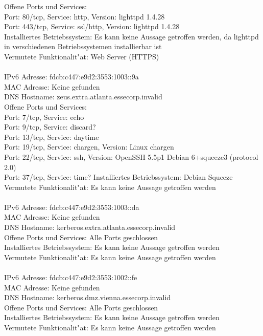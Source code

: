 \documentclass[12pt,a4paper,titlepage,oneside]{scrartcl}
\begin{document}
Offene Ports und Services:\\
Port: 80/tcp, Service: http, Version: lighttpd 1.4.28\\
Port: 443/tcp, Service: ssl/http, Version: lighttpd 1.4.28\\
Installiertes Betriebssystem: Es kann keine Aussage getroffen werden, da lighttpd in verschiedenen Betriebssystemen installierbar ist\\
Vermutete Funktionalit"at: Web Server (HTTPS)\\
\\
IPv6 Adresse: fdcb:c447:e9d2:3553:1003::9a\\
MAC Adresse: Keine gefunden\\
DNS Hostname: zeus.extra.atlanta.essecorp.invalid\\
Offene Ports und Services:\\
Port: 7/tcp, Service: echo\\
Port: 9/tcp, Service: discard?\\
Port: 13/tcp, Service: daytime\\
Port: 19/tcp, Service: chargen, Version: Linux chargen\\
Port: 22/tcp, Service: ssh, Version: OpenSSH 5.5p1 Debian 6+squeeze3 (protocol 2.0)\\
Port: 37/tcp, Service: time?
Installiertes Betriebssystem: Debian Squeeze\\
Vermutete Funktionalit"at: Es kann keine Aussage getroffen werden\\
\\
IPv6 Adresse: fdcb:c447:e9d2:3553:1003::da\\
MAC Adresse: Keine gefunden\\
DNS Hostname: kerberos.extra.atlanta.essecorp.invalid\\
Offene Ports und Services: Alle Ports geschlossen\\
Installiertes Betriebssystem: Es kann keine Aussage getroffen werden\\
Vermutete Funktionalit"at: Es kann keine Aussage getroffen werden\\
\\
IPv6 Adresse: fdcb:c447:e9d2:3553:1002::fe\\
MAC Adresse: Keine gefunden\\
DNS Hostname: kerberos.dmz.vienna.essecorp.invalid\\
Offene Ports und Services: Alle Ports geschlossen\\
Installiertes Betriebssystem: Es kann keine Aussage getroffen werden\\
Vermutete Funktionalit"at: Es kann keine Aussage getroffen werden\\
\end{document}
